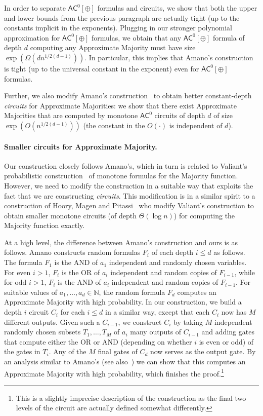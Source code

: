 \documentclass[11pt]{article}
\numberwithin{equation}{section}
\theoremstyle{definition}
\theoremstyle{plain}
\newcommand{\cclass}[1]{\textsf{#1}}
\newcommand{\AC}{\cclass{AC}}
\begin{document}
In order to separate $\AC^0[\oplus]$ formulas and circuits, we show that both the upper and lower bounds from the previous paragraph are actually tight (up to the constants implicit in the exponents). Plugging in our stronger polynomial approximation for $\AC^0[\oplus]$ formulas, we obtain that any $\AC^0[\oplus]$ formula of depth $d$ computing any Approximate Majority must have size $\exp(\Omega(dn^{1/2(d-1)}))$. In particular, this implies that Amano's construction is tight (up to the universal constant in the exponent) even for $\AC^0[\oplus]$ formulas. 

Further, we also modify Amano's construction~\cite{Amano-appxmaj} to obtain better constant-depth \emph{circuits} for Approximate Majorities: we show that there exist Approximate Majorities that are computed by monotone $\AC^0$ circuits of depth $d$ of size $\exp(O(n^{1/2(d-1)}))$ (the constant in the $O(\cdot)$ is independent of $d$). 

\paragraph{Smaller circuits for Approximate Majority.} Our construction closely follows Amano's, which in turn is related to Valiant's probabilistic construction~\cite{Valiant-maj} of monotone formulas for the Majority function. However, we need to modify the construction in a suitable way that exploits the fact that we are constructing \emph{circuits}. This modification is in a similar spirit to a construction of Hoory, Magen and Pitassi~\cite{hoory2006monotone} who modify Valiant's construction to obtain smaller monotone circuits (of depth $\Theta(\log n)$) for computing the Majority function exactly.

At a high level, the difference between Amano's construction and ours is as
follows. Amano constructs random formulas $F_i$ of each depth $i\leq d$ as
follows. The formula $F_1$ is the AND of $a_1$ independent and randomly
chosen variables.
%
%
%
%
For even $i>1$, $F_i$ is the OR  of $a_i$ independent and random copies of $F_{i-1}$, while for odd $i > 1$, $F_i$ is the AND  of $a_i$ independent and random copies of $F_{i-1}$.
%
For suitable values
of $a_1,\ldots,a_d\in \mathbb{N}$, the random formula $F_d$ computes an
Approximate Majority with high probability. In our construction, we build
a depth $i$ circuit $C_i$ for each $i\leq d$ in a similar way, except that
each $C_i$ now has $M$ different outputs. Given such a $C_{i-1}$, we
construct $C_i$ by taking $M$ independent randomly chosen subsets
$T_1,\ldots,T_M$ of $a_i$ many outputs of $C_{i-1}$ and adding gates
that compute either the OR or AND (depending on whether $i$ is even
or odd) of the gates in $T_i$. Any of the $M$ final gates of $C_d$ now
serves as the output gate. By an analysis similar to Amano's
(see also~\cite{hoory2006monotone}) we can show that this computes an
Approximate Majority with high probability, which finishes
the proof.\footnote{This is a slightly imprecise description of the
construction as the final two levels of the circuit are actually defined
somewhat differently.}
\end{document}
